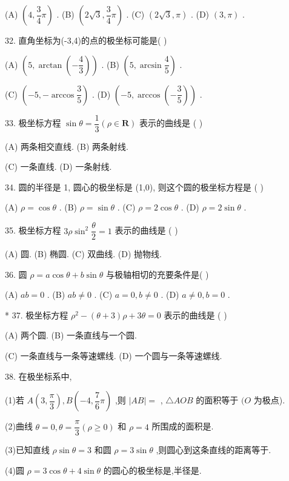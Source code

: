 (A) $\left( {4,\dfrac{3}{4}\pi }\right)$ . (B) $\left( {2\sqrt{3},\dfrac{3}{4}\pi }\right)$ . (C) $\left( {2\sqrt{3},\pi }\right)$ . (D) $\left( {3,\pi }\right)$ .

32. 直角坐标为(-3,4)的点的极坐标可能是(   )

(A) $\left( {5,\arctan \left( {-\dfrac{4}{3}}\right) }\right)$ . (B) $\left( {5,\arcsin \dfrac{4}{5}}\right)$ .

(C) $\left( {-5, - \arccos \dfrac{3}{5}}\right)$ . (D) $\left( {-5,\arccos \left( {-\dfrac{3}{5}}\right) }\right)$ .

33. 极坐标方程 $\sin \theta  = \dfrac{1}{3}\left( {\rho  \in  \mathbf{R}}\right)$ 表示的曲线是 (   )

(A) 两条相交直线. (B) 两条射线.

(C) 一条直线. (D) 一条射线.

34. 圆的半径是 1, 圆心的极坐标是 (1,0), 则这个圆的极坐标方程是 (   )

(A) $\rho  = \cos \theta$ . (B) $\rho  = \sin \theta$ . (C) $\rho  = 2\cos \theta$ . (D) $\rho  = 2\sin \theta$ .

35. 极坐标方程 ${3\rho }{\sin }^{2}\dfrac{\theta }{2} = 1$ 表示的曲线是 (   )

(A) 圆. (B) 椭圆. (C) 双曲线. (D) 抛物线.

36. 圆 $\rho  = a\cos \theta  + b\sin \theta$ 与极轴相切的充要条件是(   )

(A) ${ab} = 0$ . (B) ${ab} \neq  0$ . (C) $a = 0,b \neq  0$ . (D) $a \neq  0,b = 0$ .

* 37. 极坐标方程 ${\rho }^{2} - \left( {\theta  + 3}\right) \rho  + {3\theta } = 0$ 表示的曲线是 (   )

(A) 两个圆. (B) 一条直线与一个圆.

(C) 一条直线与一条等速螺线. (D) 一个圆与一条等速螺线.

38. 在极坐标系中,

(1)若 $A\left( {3,\dfrac{\pi }{3}}\right) ,B\left( {-4,\dfrac{7}{6}\pi }\right)$ ,则 $\left| {AB}\right|  =$ \blkda{}, $\bigtriangleup  {AOB}$ 的面积等于\blkda{} $(O$ 为极点).

(2)曲线 $\theta  = 0,\theta  = \dfrac{\pi }{3}\left( {\rho  \geq  0}\right)$ 和 $\rho  = 4$ 所围成的面积是\blkda{}.

(3)已知直线 $\rho \sin \theta  = 3$ 和圆 $\rho  = 3\sin \theta$ ,则圆心到这条直线的距离等于\blkda{}.

(4)圆 $\rho  = 3\cos \theta  + 4\sin \theta$ 的圆心的极坐标是\blkda{},半径是\blkda{}.

